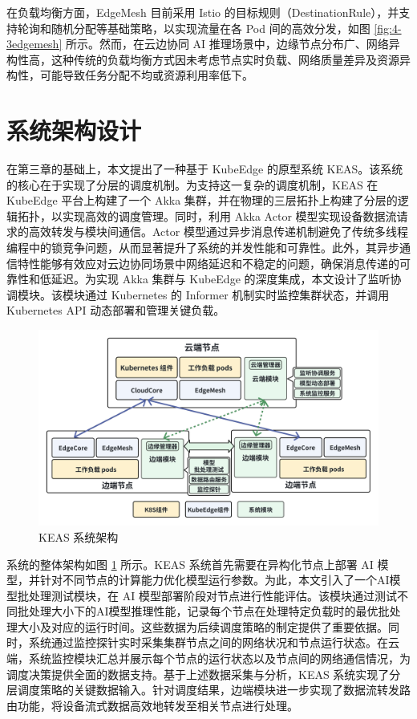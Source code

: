 在负载均衡方面，EdgeMesh 目前采用 Istio 的目标规则（DestinationRule），并支持轮询和随机分配等基础策略，以实现流量在各 Pod 间的高效分发，如图 \ref{fig:4-3edgemesh} 所示。然而，在云边协同 AI 推理场景中，边缘节点分布广、网络异构性高，这种传统的负载均衡方式因未考虑节点实时负载、网络质量差异及资源异构性，可能导致任务分配不均或资源利用率低下。

\section{系统架构设计}

在第三章的基础上，本文提出了一种基于 KubeEdge 的原型系统 KEAS。该系统的核心在于实现了分层的调度机制。为支持这一复杂的调度机制，KEAS 在 KubeEdge 平台上构建了一个 Akka 集群，并在物理的三层拓扑上构建了分层的逻辑拓扑，以实现高效的调度管理。同时，利用 Akka Actor 模型实现设备数据流请求的高效转发与模块间通信。Actor 模型通过异步消息传递机制避免了传统多线程编程中的锁竞争问题，从而显著提升了系统的并发性能和可靠性。此外，其异步通信特性能够有效应对云边协同场景中网络延迟和不稳定的问题，确保消息传递的可靠性和低延迟。为实现 Akka 集群与 KubeEdge 的深度集成，本文设计了监听协调模块。该模块通过 Kubernetes 的 Informer 机制实时监控集群状态，并调用 Kubernetes API 动态部署和管理关键负载。

\begin{figure}[ht]
  \centering
  \includegraphics[width=\linewidth]{pics/4-4系统架构.png}
  \caption{KEAS 系统架构}
  \label{fig:4-4arch}
\end{figure}

系统的整体架构如图 \ref{fig:4-4arch} 所示。KEAS 系统首先需要在异构化节点上部署 AI 模型，并针对不同节点的计算能力优化模型运行参数。为此，本文引入了一个AI模型批处理测试模块，在 AI 模型部署阶段对节点进行性能评估。该模块通过测试不同批处理大小下的AI模型推理性能，记录每个节点在处理特定负载时的最优批处理大小及对应的运行时间。这些数据为后续调度策略的制定提供了重要依据。同时，系统通过监控探针实时采集集群节点之间的网络状况和节点运行状态。在云端，系统监控模块汇总并展示每个节点的运行状态以及节点间的网络通信情况，为调度决策提供全面的数据支持。基于上述数据采集与分析，KEAS 系统实现了分层调度策略的关键数据输入。针对调度结果，边端模块进一步实现了数据流转发路由功能，将设备流式数据高效地转发至相关节点进行处理。

